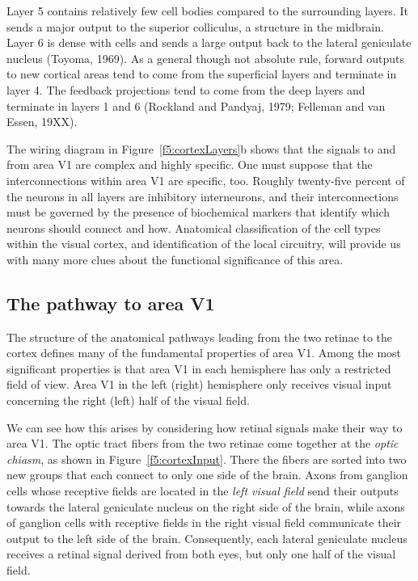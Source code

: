 Layer 5 contains relatively few cell bodies compared to the
surrounding layers.
It sends a major output to the superior colliculus, a
structure in the midbrain.
Layer 6 is dense with cells and
sends a large output back to the lateral geniculate
nucleus (Toyoma, 1969).
As a general though not absolute rule,
forward outputs to new cortical areas tend to
come from the superficial layers and terminate in layer 4.
The feedback projections tend to come from the deep layers
and terminate in layers 1 and 6 (Rockland and Pandyaj, 1979;
Felleman and van Essen, 19XX).

The wiring diagram in Figure~\ref{f5:cortexLayers}b shows
that the signals to and from area V1 are complex and
highly specific.
One must suppose that the interconnections within area
V1 are specific, too.
Roughly twenty-five percent of the neurons in all
layers are inhibitory interneurons,
and their interconnections must
be governed by the presence of biochemical markers that identify
which neurons should connect and how.
Anatomical classification of the cell types within the visual
cortex, and identification of the local circuitry,
will provide us with many more clues about the
functional significance of this area.

\subsection*{The pathway to area V1}

The structure of the anatomical pathways leading from the two retinae
to the cortex defines many of the fundamental properties of area V1.
Among the most significant properties is that area V1 in each
hemisphere has only a restricted field of view.  Area V1 in the left
(right) hemisphere only receives visual input concerning the right
(left) half of the visual field.

We can see how this arises by considering how retinal signals make
their way to area V1.  The optic tract fibers from the two retinae
come together at the {\em optic chiasm}, as shown in
Figure~\ref{f5:cortexInput}.  There the fibers are sorted into two new
groups that each connect to only one side of the brain.  Axons from
ganglion cells whose receptive fields are located in the {\em left
visual field} send their outputs towards the lateral geniculate
nucleus on the right side of the brain, while axons of ganglion cells
with receptive fields in the right visual field communicate their
output to the left side of the brain.  Consequently, each lateral
geniculate nucleus receives a retinal signal derived from both eyes,
but only one half of the visual field.

